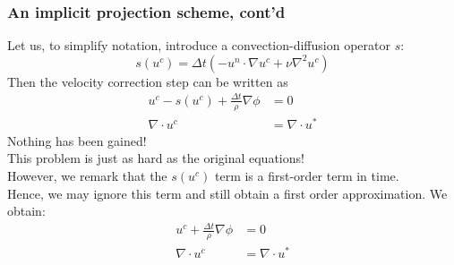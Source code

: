 \begin{frame}
\frametitle{An implicit projection scheme, cont'd}
Let us, to simplify notation, introduce
a convection-diffusion operator $s$: 
\[
s(u^c) =   \Delta t (-u^n \cdot \nabla u^c +  \nu \nabla^2 u^c)  
\]
Then the velocity correction step can be written as 
\begin{align*}
u^c - s(u^c) + \frac{\Delta t}{\rho} \nabla \phi &= 0 \\ 
\nabla \cdot u^c &= \nabla \cdot u^* 
\end{align*}
\alert{Nothing has been gained!} \\
This problem is just as hard as the original equations! \\
However, we remark that the $s(u^c)$ term is a first-order term in time.\\ 
Hence, we may ignore this term and still obtain a first order approximation. 
We obtain: 
\begin{align*}
u^c + \frac{\Delta t}{\rho} \nabla \phi &= 0 \\ 
\nabla \cdot u^c &= \nabla \cdot u^* 
\end{align*}
\end{frame}

